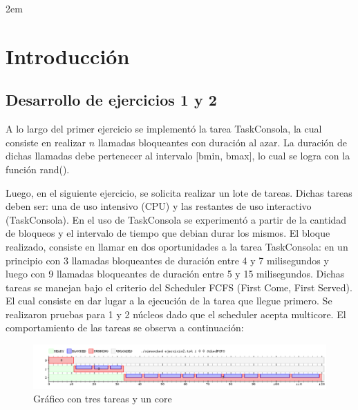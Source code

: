 \documentclass[a4paper,11pt]{article}
\begin{document}

\maketitle

\parindent 2em %
\parskip 4pt %
\renewcommand{\baselinestretch}{1.5}


\tableofcontents

\setcounter{section}{0}

\newpage

\section{Introducci\'on}

\subsection{Desarrollo de ejercicios 1 y 2}
A lo largo del primer ejercicio se implementó la tarea TaskConsola, la cual consiste en realizar $n$ llamadas bloqueantes con duración al azar. La duración de dichas llamadas debe pertenecer al intervalo [bmin, bmax], lo cual se logra con la función rand().

Luego, en el siguiente ejercicio, se solicita realizar un lote de tareas. Dichas tareas deben ser: una de uso intensivo (CPU) y las restantes de uso interactivo (TaskConsola). En el uso de TaskConsola se experimentó a partir de la cantidad de bloqueos y el intervalo de tiempo que debian durar los mismos.
El bloque realizado, consiste en llamar en dos oportunidades a la tarea TaskConsola: en un principio con 3 llamadas bloqueantes de duraci\'on entre 4 y 7 milisegundos y luego con 9 llamadas bloqueantes de duraci\'on entre 5 y 15 milisegundos.
Dichas tareas se manejan bajo el criterio del Scheduler FCFS (First Come, First Served). El cual consiste en dar lugar a la ejecuci\'on de la tarea que llegue primero.
Se realizaron pruebas para 1 y 2 n\'ucleos dado que el scheduler acepta multicore. El comportamiento de las tareas se observa a continuación:

\begin{figure}[H]
\centering
\includegraphics[scale=.6, width=1\textwidth]{graficos/ej2-1core}
\caption{Gráfico con tres tareas y un core}
\end{figure}
\end{document}
